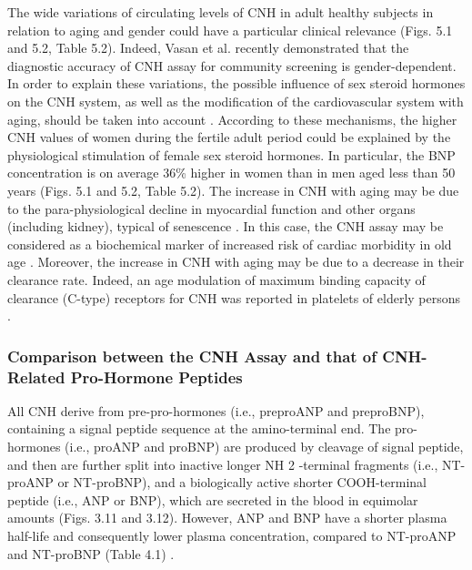 \documentclass[14pt,a4paper,onecolumn]{extarticle}
\begin{document}
The wide variations of circulating levels of CNH in adult healthy subjects in relation to aging and gender could have a particular clinical relevance \citep{bib37} \citep{bib38} \citep{bib39} \citep{bib310} (Figs. 5.1 and 5.2, Table 5.2). Indeed, Vasan et al. \citep{bib39} recently demonstrated that the diagnostic accuracy of CNH assay for community screening is gender-dependent.
In order to explain these variations, the possible influence of sex steroid hormones
on the CNH system, as well as the modification of the cardiovascular system with aging,
should be taken into account \citep{bib311} \citep{bib312} \citep{bib313} \citep{bib314}. According to these mechanisms, the higher CNH
values of women during the fertile adult period could be explained by the physiological stimulation of female sex steroid hormones. In particular, the BNP concentration is
on average 36\% higher in women than in men aged less than 50 years \citep{bib37} (Figs. 5.1 and 5.2, Table 5.2). The increase in CNH with aging may be due to the para-physiological
decline in myocardial function and other organs (including kidney), typical of senescence \citep{bib315}. In this case, the CNH assay may be considered as a biochemical marker of
increased risk of cardiac morbidity in old age \citep{bib316}. Moreover, the increase in CNH with
aging may be due to a decrease in their clearance rate. Indeed, an age modulation of
maximum binding capacity of clearance (C-type) receptors for CNH was reported in
platelets of elderly persons \citep{bib317}.


\subsubsection{ Comparison between the CNH Assay and that of CNH-Related Pro-Hormone Peptides}

All CNH derive from pre-pro-hormones (i.e., preproANP and preproBNP), containing
a signal peptide sequence at the amino-terminal end. The pro-hormones (i.e., proANP
and proBNP) are produced by cleavage of signal peptide, and then are further split into
inactive longer NH 2 -terminal fragments (i.e., NT-proANP or NT-proBNP), and a biologically active shorter COOH-terminal peptide (i.e., ANP or BNP), which are secreted
in the blood in equimolar amounts (Figs. 3.11 and 3.12). However, ANP and BNP have
a shorter plasma half-life and consequently lower plasma concentration, compared to
NT-proANP and NT-proBNP (Table 4.1) \citep{bib31} \citep{bib32} \citep{bib33} \citep{bib34} \citep{bib35} \citep{bib36} \citep{bib37} \citep{bib318}.
\end{document}

